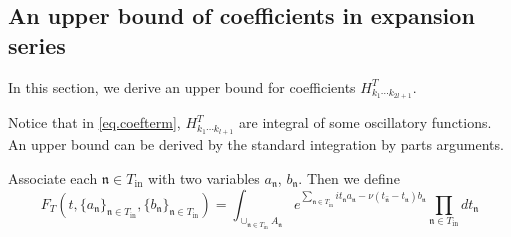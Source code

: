 \subsection{An upper bound of coefficients in expansion series}\label{sec.uppcoef} In this section, we derive an upper bound for coefficients $H^T_{k_1\cdots k_{2l+1}}$.

Notice that in \eqref{eq.coefterm}, $H^T_{k_1\cdots k_{l+1}}$ are integral of some oscillatory functions. An upper bound can be derived by the standard integration by parts arguments.

Associate each $\mathfrak{n}\in T_{\text{in}}$ with two variables $a_{\mathfrak{n}}$, $b_{\mathfrak{n}}$. Then we define
\begin{equation}\label{eq.defF_T}
F_{T}(t,\{a_{\mathfrak{n}}\}_{\mathfrak{n}\in T_{\text{in}}},\{b_{\mathfrak{n}}\}_{\mathfrak{n}\in T_{\text{in}}})=\int_{\cup_{\mathfrak{n}\in T_{\text{in}}} A_{\mathfrak{n}}} e^{\sum_{\mathfrak{n}\in T_{\text{in}}} it_{\mathfrak{n}} a_{\mathfrak{n}} - \nu(t_{\widehat{\mathfrak{n}}}-t_{\mathfrak{n}})b_{\mathfrak{n}}} \prod_{\mathfrak{n}\in T_{\text{in}}} dt_{\mathfrak{n}} 
\end{equation}

